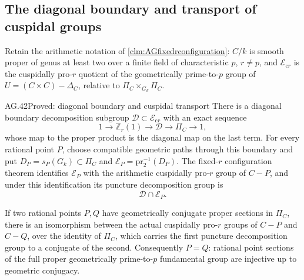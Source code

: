 \subsection{The diagonal boundary and transport of cuspidal groups}

Retain the arithmetic notation of
\ref{clm:AGfixedrconfiguration}: \(C/k\) is smooth proper
of genus at least two over a finite field of characteristic
\(p\), \(r\ne p\), and
\(\mathcal E_{\mathrm{c}r}\) is the cuspidally pro-\(r\)
quotient of the geometrically prime-to-\(p\) group of
\(U=(C\times C)-\Delta_C\), relative to
\(\Pi_C\times_{G_k}\Pi_C\).

\begin{claim}{AG.42}{Proved: diagonal boundary and cuspidal transport}
\label{clm:AGcuspidaltransport}
There is a diagonal boundary decomposition subgroup
\(\mathcal D\subset\mathcal E_{\mathrm{c}r}\) with
an exact sequence
\[
 1\longrightarrow\mathbb Z_r(1)\longrightarrow\mathcal D
 \longrightarrow\Pi_C\longrightarrow1,
                                                        \tag{AG.42.1}
\]
whose map to the proper product is the diagonal map on
the last term. For every rational point \(P\), choose
compatible geometric paths through this boundary and put
\(D_P=s_P(G_k)\subset\Pi_C\) and
\(\mathcal E_P=\mathrm{pr}_2^{-1}(D_P)\).
The fixed-\(r\) configuration theorem identifies
\(\mathcal E_P\) with the arithmetic cuspidally
pro-\(r\) group of \(C-P\), and under this
identification its puncture decomposition group is
\[
                           \mathcal D\cap\mathcal E_P.
                                                        \tag{AG.42.2}
\]

If two rational points \(P,Q\) have geometrically conjugate
proper sections in \(\Pi_C\), there is an isomorphism
between the actual cuspidally pro-\(r\) groups of
\(C-P\) and \(C-Q\), over the identity of
\(\Pi_C\), which carries the first puncture decomposition
group to a conjugate of the second. Consequently
\(P=Q\): rational point sections of the full proper
geometrically prime-to-\(p\) fundamental group are
injective up to geometric conjugacy.
\end{claim}

